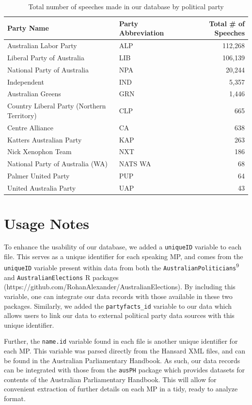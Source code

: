\documentclass[
  letterpaper,
  DIV=11,
  numbers=noendperiod]{scrartcl}
\begin{document}
\hypertarget{tbl-speeches_by_party}{}
\begin{table}[H]
\caption{\label{tbl-speeches_by_party}Total number of speeches made in our database by political party }\tabularnewline

\centering
\begin{tabular}{llr}
\toprule
Party Name & Party Abbreviation & Total \# of Speeches\\
\midrule
Australian Labor Party & ALP & 112,268\\
Liberal Party of Australia & LIB & 106,139\\
National Party of Australia & NPA & 20,244\\
Independent & IND & 5,357\\
Australian Greens & GRN & 1,446\\
\addlinespace
Country Liberal Party (Northern Territory) & CLP & 665\\
Centre Alliance & CA & 638\\
Katters Australian Party & KAP & 263\\
Nick Xenophon Team & NXT & 186\\
National Party of Australia (WA) & NATS WA & 68\\
\addlinespace
Palmer United Party & PUP & 64\\
United Australia Party & UAP & 43\\
\bottomrule
\end{tabular}
\end{table}

\hypertarget{sec-usage}{%
\section{Usage Notes}\label{sec-usage}}

To enhance the usability of our database, we added a \texttt{uniqueID}
variable to each file. This serves as a unique identifier for each
speaking MP, and comes from the \texttt{uniqueID} variable present
within data from both the
\texttt{AustralianPoliticians}\textsuperscript{9} and
\texttt{AustralianElections} R packages
(https://github.com/RohanAlexander/AustralianElections). By including
this variable, one can integrate our data records with those available
in these two packages. Similarly, we added the \texttt{partyfacts\_id}
variable to our data which allows users to link our data to external
political party data sources with this unique identifier.

Further, the \texttt{name.id} variable found in each file is another
unique identifier for each MP. This variable was parsed directly from
the Hansard XML files, and can be found in the Australian Parliamentary
Handbook. As such, our data records can be integrated with those from
the \texttt{ausPH} package which provides datasets for contents of the
Australian Parliamentary Handbook. This will allow for convenient
extraction of further details on each MP in a tidy, ready to analyze
format.
\end{document}
